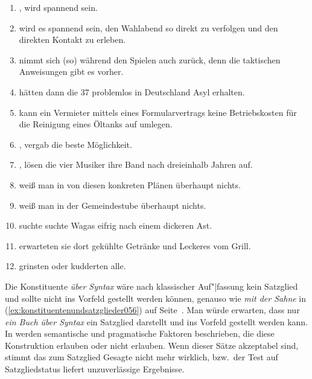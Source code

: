 \begin{enumerate}
  \item {}, wird spannend sein.
  \item \VfTest {} wird es spannend sein, den Wahlabend so direkt zu verfolgen und den direkten Kontakt zu erleben.
  \item \VfTest [Er] nimmt sich (so) während den Spielen auch zurück, denn die taktischen Anweisungen gibt es vorher.
  \item {} hätten dann die 37 problemlos in Deutschland Asyl erhalten.
  \item \VfTest {} kann ein Vermieter mittels eines Formularvertrags keine Betriebskosten für die Reinigung eines Öltanks auf umlegen.
  \item {}, vergab die beste Möglichkeit.
  \item {}, lösen die vier Musiker ihre Band nach dreieinhalb Jahren auf.
  \item \VfTest {} weiß man in von diesen konkreten Plänen überhaupt nichts.
  \item {} weiß man in der Gemeindestube überhaupt nichts.
  \item \VfTest [Um zu helfen] suchte suchte Wagas eifrig nach einem dickeren Ast.
  \item {} erwarteten sie dort gekühlte Getränke und Leckeres vom Grill.
  \item {} grinsten oder kudderten alle.
\end{enumerate}

\label{sol:konstituentenstruktur03}

Die Konstituente \textit{über Syntax} wäre nach klassischer Auf"|fassung kein Satzglied und sollte nicht ins Vorfeld gestellt werden können, genauso wie \textit{mit der Sahne} in (\ref{ex:konstituentenundsatzglieder056}) auf Seite~\pageref{ex:konstituentenundsatzglieder056}.
Man würde erwarten, dass nur \textit{ein Buch über Syntax} ein Satzglied darstellt und ins Vorfeld gestellt werden kann.
In \citet{Dekuthy2002} werden semantische und pragmatische Faktoren beschrieben, die diese Konstruktion erlauben oder nicht erlauben.
Wenn dieser Sätze akzeptabel sind, stimmt das zum Satzglied Gesagte nicht mehr wirklich, bzw.\ der Test auf Satzgliedstatus liefert unzuverlässige Ergebnisse.

